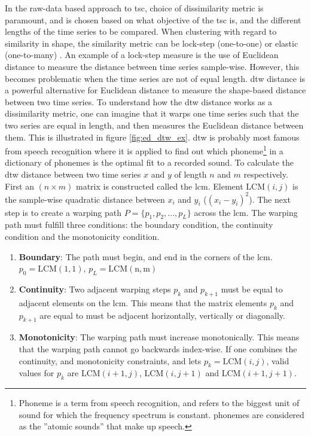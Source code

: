 In the raw-data based approach to \acrshort{tsc}, choice of dissimilarity metric is paramount, and is chosen based on what objective of the \acrshort{tsc} is, and the different lengths of the time series to be compared. When clustering with regard to similarity in shape, the similarity metric can be lock-step (one-to-one) or elastic (one-to-many) \cite{tsc_rev}. An example of a lock-step measure is the use of Euclidean distance to measure the distance between time series sample-wise. However, this becomes problematic when the time series are not of equal length. \acrfull{dtw} distance is a powerful alternative for Euclidean distance to measure the shape-based distance between two time series. To understand how the \acrshort{dtw} distance works as a dissimilarity metric, one can imagine that it warps one time series such that the two series are equal in length, and then measures the Euclidean distance between them. This is illustrated in figure \ref{fig:ed_dtw_ex}. \acrshort{dtw} is probably most famous from speech recognition where it is applied to find out which phoneme\footnote{Phoneme is a term from speech recognition, and refers to the biggest unit of sound for which the frequency spectrum is constant. phonemes are considered as the ''atomic sounds'' that make up speech.} in a dictionary of phonemes is the optimal fit to a recorded sound. To calculate the \acrshort{dtw} distance between two time series $x$ and $y$ of length $n$ and $m$ respectively. First an $(n \times m)$ matrix is constructed called the \acrfull{lcm}. Element $\mathrm{LCM}(i,j)$ is the sample-wise quadratic distance between $x_i$ and $y_i$ ($(x_i - y_i)^2$). The next step is to create a warping path $P = \{p_1, p_2, ..., p_L\}$ across the \acrshort{lcm}. The warping path must fulfill three conditions: the boundary condition, the continuity condition and the monotonicity condition. 

\begin{enumerate} 
    \item \textbf{Boundary}: The path must begin, and end in the corners of the \acrshort{lcm}. $p_0 = \mathrm{LCM(1,1)}$, $p_L = \mathrm{LCM(n,m)}$ 
    \item \textbf{Continuity}: Two adjacent warping steps $p_k$ and $p_{k+1}$ must be equal to adjacent elements on the \acrshort{lcm}. This means that the matrix elements $p_k$ and $p_{k+1}$ are equal to must be adjacent horizontally, vertically or diagonally.
    \item \textbf{Monotonicity}: The warping path must increase monotonically. This means that the warping path cannot go backwards index-wise. If one combines the continuity, and monotonicity constraints, and lets $p_k = \mathrm{LCM}(i,j)$, valid values for $p_k$ are $\mathrm{LCM}(i+1,j)$, $\mathrm{LCM}(i,j+1)$ and $\mathrm{LCM}(i+1,j+1)$.
\end{enumerate}

